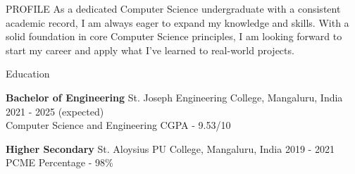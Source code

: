 \documentclass{resume} %
\begin{document}
\begin{rSection}{PROFILE}
    {
        As a dedicated Computer Science undergraduate
        with a consistent
        academic record, I am always eager to expand my knowledge
        and skills. With a solid foundation in core Computer Science
        principles, I am looking forward to start my career and
        apply what I've learned to real-world projects.
    }

\end{rSection}

\begin{rSection}{Education}

    {\bf Bachelor of Engineering} \textbar{} St. Joseph Engineering College, Mangaluru, India \hfill {2021 - 2025 (expected)}\\
    Computer Science and Engineering \textbar{} CGPA - 9.53/10

    {\bf Higher Secondary} \textbar{} St. Aloysius PU College, Mangaluru, India \hfill {2019 - 2021}\\
    PCME \textbar{} Percentage - 98\%



\end{rSection}
\end{document}
